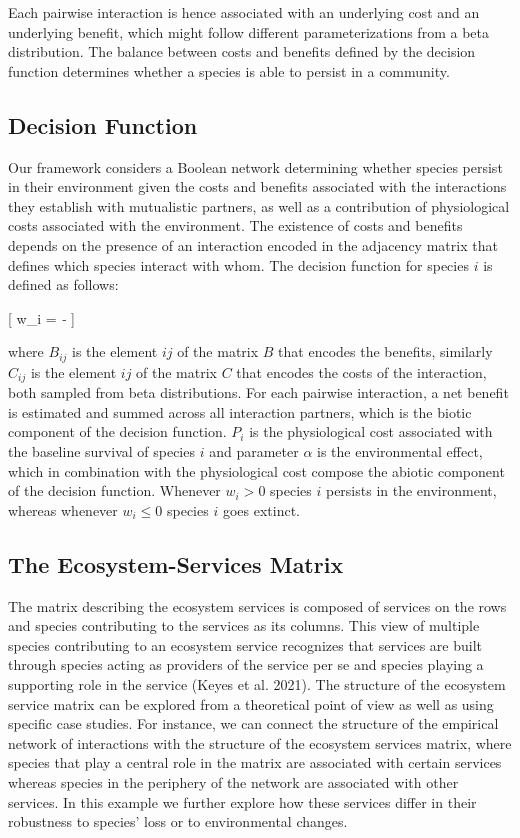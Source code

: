 \documentclass[
  letterpaper,
  DIV=11,
  numbers=noendperiod]{scrartcl}
\begin{document}
Each pairwise interaction is hence associated with an underlying cost
and an underlying benefit, which might follow different
parameterizations from a beta distribution. The balance between costs
and benefits defined by the decision function determines whether a
species is able to persist in a community.

\subsection{Decision Function}\label{decision-function}

Our framework considers a Boolean network determining whether species
persist in their environment given the costs and benefits associated
with the interactions they establish with mutualistic partners, as well
as a contribution of physiological costs associated with the
environment. The existence of costs and benefits depends on the presence
of an interaction encoded in the adjacency matrix that defines which
species interact with whom. The decision function for species \(i\) is
defined as follows:

{[} w\_i = \emph{ -
} {]}

where \(B_{ij}\) is the element \(ij\) of the matrix \(B\) that encodes
the benefits, similarly \(C_{ij}\) is the element \(ij\) of the matrix
\(C\) that encodes the costs of the interaction, both sampled from beta
distributions. For each pairwise interaction, a net benefit is estimated
and summed across all interaction partners, which is the biotic
component of the decision function. \(P_i\) is the physiological cost
associated with the baseline survival of species \(i\) and parameter
\(\alpha\) is the environmental effect, which in combination with the
physiological cost compose the abiotic component of the decision
function. Whenever \(w_i > 0\) species \(i\) persists in the
environment, whereas whenever \(w_i \leq 0\) species \(i\) goes extinct.

\subsection{The Ecosystem-Services
Matrix}\label{the-ecosystem-services-matrix}

The matrix describing the ecosystem services is composed of services on
the rows and species contributing to the services as its columns. This
view of multiple species contributing to an ecosystem service recognizes
that services are built through species acting as providers of the
service per se and species playing a supporting role in the service
(Keyes et al. 2021). The structure of the ecosystem service matrix can
be explored from a theoretical point of view as well as using specific
case studies. For instance, we can connect the structure of the
empirical network of interactions with the structure of the ecosystem
services matrix, where species that play a central role in the matrix
are associated with certain services whereas species in the periphery of
the network are associated with other services. In this example we
further explore how these services differ in their robustness to
species' loss or to environmental changes.
\end{document}
